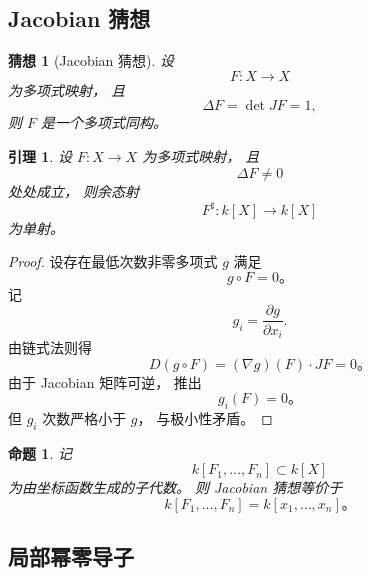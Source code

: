 \documentclass[11pt]{article}
\theoremstyle{plain}
\newtheorem{proposition}[theorem]{命题}
\newtheorem{lemma}[theorem]{引理}
\newtheorem{conjecture}[theorem]{猜想}
\theoremstyle{definition}
\theoremstyle{remark}
\renewcommand{\det}{\operatorname{det}}
\begin{document}
\subsection{Jacobian 猜想}
\begin{conjecture}[Jacobian 猜想]
    设
    \[
        F:X\to X
    \]
    为多项式映射，
    且
    \[
        \Delta F=\det JF=1,
    \]
    则 $F$ 是一个多项式同构。
\end{conjecture}



\begin{lemma}
    设 $F:X\to X$ 为多项式映射，
    且
    \[
        \Delta F\neq0
    \]
    处处成立，
    则余态射
    \[
        F^\sharp:k[X]\to k[X]
    \]
    为单射。
\end{lemma}

\begin{proof}
    设存在最低次数非零多项式
    $g$
    满足
    \[
        g\circ F=0。
    \]
    记
    \[
        g_i=\frac{\partial g}{\partial x_i}.
    \]
    由链式法则得
    \[
        D(g\circ F)
        =
        (\nabla g)(F)\cdot JF=0。
    \]
    由于 Jacobian 矩阵可逆，
    推出
    \[
        g_i(F)=0。
    \]
    但 $g_i$ 次数严格小于 $g$，
    与极小性矛盾。
\end{proof}
\begin{proposition}
    记
    \[
        k[F_1,\dots,F_n]
        \subset k[X]
    \]
    为由坐标函数生成的子代数。
    则 Jacobian 猜想等价于
    \[
        k[F_1,\dots,F_n]
        =
        k[x_1,\dots,x_n]。
    \]
\end{proposition}
\subsection{局部幂零导子}
\end{document}
